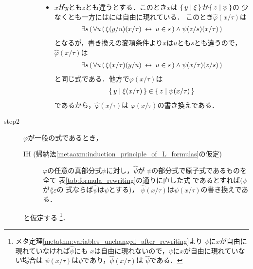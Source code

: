 \begin{metaprf}[第一]
\begin{description}
\begin{description}
\begin{itemize}
							\item $x$が$y$とも$z$とも違うとする．このとき$x$は
								$\{\, y \mid \xi\, \}$か$\{\, z \mid \psi\, \}$の
								少なくとも一方にはには自由に現れている．
								このとき$\widehat{\varphi}(x/\tau)$は
								\begin{align}
									\exists s\, (\, \forall u\, (\, \xi(y/u)(x/\tau) \hspace{0.25em}\leftrightarrow\hspace{0.25em} u \in s\, ) \wedge \psi(z/s)(x/\tau)\, )
								\end{align}
								となるが，書き換えの変項条件より$x$は$u$とも$s$とも違うので，
								$\widehat{\varphi}(x/\tau)$は
								\begin{align}
									\exists s\, (\, \forall u\, (\, \xi(x/\tau)(y/u) \hspace{0.25em}\leftrightarrow\hspace{0.25em} u \in s\, ) \wedge \psi(x/\tau)(z/s)\, )
								\end{align}
								と同じ式である．他方で$\varphi(x/\tau)$は
								\begin{align}
									\{\, y \mid \xi(x/\tau)\, \} \in \{\, z \mid \psi(x/\tau)\, \}
								\end{align}
								であるから，$\widehat{\varphi}(x/\tau)$は
								$\varphi(x/\tau)$の書き換えである．
						\end{itemize}
				\end{description}
			
			\item[step2] $\varphi$が一般の式であるとき，
				\begin{description}
					\item[IH (帰納法\ref{metaaxm:induction_principle_of_L_formulas}の仮定)]
						$\varphi$の任意の真部分式$\psi$に対し，$\widehat{\psi}$が
						$\psi$の部分式で原子式であるものを全て
						表\ref{tab:formula_rewriting}の通りに直した式
						であるとすれば($\psi$が$\lang{\varepsilon}$の
						式ならば$\widehat{\psi}$は$\psi$とする)，
						$\widehat{\psi}(x/\tau)$は$\psi(x/\tau)$の書き換えである．
				\end{description}
				と仮定する
				\footnote{
					メタ定理\ref{metathm:variables_unchanged_after_rewriting}より
					$\psi$に$x$が自由に現れていなければ$\widehat{\psi}$にも
					$x$は自由に現れないので，$\psi$に$x$が自由に現れていない場合は
					$\psi(x/\tau)$は$\psi$であり，$\widehat{\psi}(x/\tau)$は
					$\widehat{\psi}$である．
				}．
				

\end{description}
\end{metaprf}
